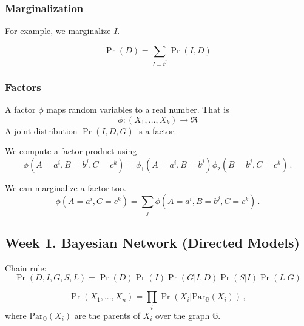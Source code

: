 \documentclass[12pt]{article}
\begin{document}
\subsubsection{Marginalization}
For example, we marginalize $I$.

\begin{equation*}
  \Pr(D) = \sum_{I=i^j} \Pr(I, D)
\end{equation*}


\subsubsection{Factors}
A factor $\phi$ maps random variables to a real number. That is
\begin{equation*}
  \phi : (X_1, \ldots, X_k) \rightarrow \Re
\end{equation*}
A joint distribution $\Pr(I, D, G)$ is a factor.

We compute a factor product using
\begin{equation*}
  \phi(A=a^i, B=b^j, C=c^k) = \phi_1(A=a^i, B=b^j) \phi_2(B=b^j, C=c^k) \, .
\end{equation*}

We can marginalize a factor too.
\begin{equation*}
  \phi(A=a^i, C=c^k) = \sum_j \phi(A=a^i, B=b^j, C=c^k) \,.
\end{equation*}




\subsection{Week 1. Bayesian Network (Directed Models)}

Chain rule:
\begin{equation}
  \Pr(D, I, G, S, L) = \Pr(D) \Pr(I) \Pr(G|I, D) \Pr(S|I) \Pr(L|G)
\end{equation}

\begin{equation}
  \Pr(X_1, ..., X_n) = \prod_i \Pr(X_i | \text{Par}_\mathbb{G}( X_i ) ) \, ,
\end{equation}
where $\text{Par}_\mathbb{G}( X_i )$ are the parents of $X_i$ over the graph $\mathbb{G}$.




\end{document}
